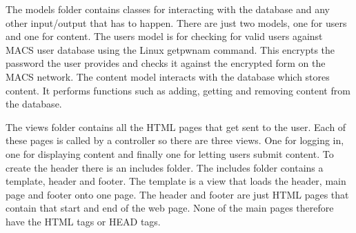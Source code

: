 The models folder contains classes for interacting with the database and any other input/output that has to happen. There are just two models, one for users and one for content. The users model is for checking for valid users against MACS user database using the Linux getpwnam command. This encrypts the password the user provides and checks it against the encrypted form on the MACS network. The content model interacts with the database which stores content. It performs functions such as adding, getting and removing content from the database.

The views folder contains all the HTML pages that get sent to the user. Each of these pages is called by a controller so there are three views. One for logging in, one for displaying content and finally one for letting users submit content. To create the header there is an includes folder. The includes folder contains a template, header and footer. The template is a view that loads the header, main page and footer onto one page. The header and footer are just HTML pages that contain that start and end of the web page. None of the main pages therefore have the HTML tags or HEAD tags. 
